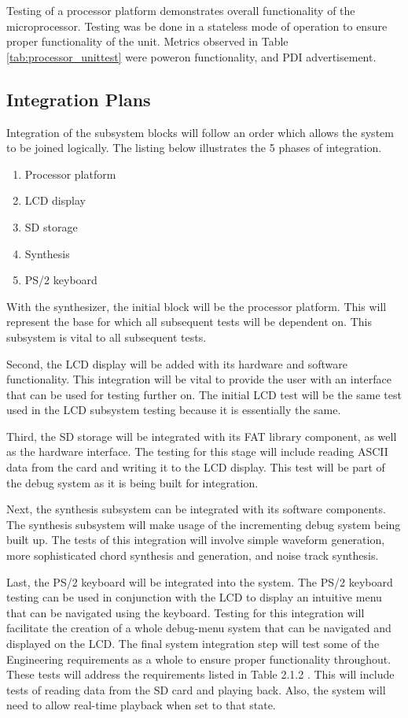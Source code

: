 \documentclass[bibtotocnumbered,abstract=on,paper=a4,fontsize=12pt,parskip=on,halfparskip=on]{scrartcl}		%
\begin{document}
Testing of a processor platform demonstrates overall functionality of the microprocessor. Testing was be done in a stateless mode of operation to ensure proper functionality of the unit. Metrics observed in Table \ref{tab:processor_unittest} were poweron functionality, and PDI advertisement.

  \subsection{Integration Plans}

Integration of the subsystem blocks will follow an order which allows the system to be joined logically. The listing below illustrates the 5 phases of integration.

  \begin{enumerate}
    \item{Processor platform}
    \item{LCD display}
    \item{SD storage}
    \item{Synthesis}
    \item{PS/2 keyboard}
  \end{enumerate}

With the synthesizer, the initial block will be the processor platform. This will represent the base for which all subsequent tests will be dependent on. This subsystem is vital to all subsequent tests. 

Second, the LCD display will be added with its hardware and software functionality. This integration will be vital to provide the user with an interface that can be used for testing further on. The initial LCD test will be the same test used in the LCD subsystem testing because it is essentially the same.

Third, the SD storage will be integrated with its FAT library component, as well as the hardware interface. The testing for this stage will include reading ASCII data from the card and writing it to the LCD display. This test will be part of the debug system as it is being built for integration.

Next, the synthesis subsystem can be integrated with its software components. The synthesis subsystem will make usage of the incrementing debug system being built up. The tests of this integration will involve simple waveform generation, more sophisticated chord synthesis and generation, and noise track synthesis.

Last, the PS/2 keyboard will be integrated into the system. The PS/2 keyboard testing can be used in conjunction with the LCD to display an intuitive menu that can be navigated using the keyboard. Testing for this integration will facilitate the creation of a whole debug-menu system that can be navigated and displayed on the LCD.
The final system integration step will test some of the Engineering requirements as a whole to ensure proper functionality throughout. These tests will address the requirements listed in Table 2.1.2 . This will include tests of reading data from the SD card and playing back. Also, the system will need to allow real-time playback when set to that state.
\end{document}
